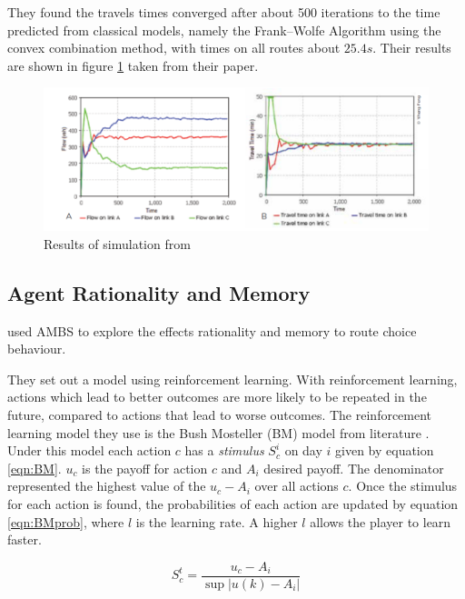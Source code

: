 \documentclass[12pt, a4paper, onecolumn]{article}
\begin{document}
 They found the travels times converged after about 500 iterations to the time predicted from classical models, namely the Frank–Wolfe Algorithm using the convex combination method, with times on all routes about $25.4s$. Their results are shown in figure \ref{fig:primer} taken from their paper.

 \begin{figure}[h!]
	\centering
	\includegraphics[scale=.75]{primer_results.png}
	\caption{Results of simulation from \cite{Zheng2013}}
	\label{fig:primer}
	\end{figure}

\subsection{Agent Rationality and Memory}
\cite{Wei2014} used AMBS to explore the effects rationality and memory to route choice behaviour.

They set out a model using reinforcement learning. With reinforcement learning, actions which lead to better outcomes are more likely to be repeated in the future, compared to actions that lead to worse outcomes. The reinforcement learning model they use is the Bush Mosteller (BM) model from literature \citep{Cross1973}. Under this model each action $c$ has a \textit{stimulus} $S_{c}^{i}$ on day $i$ given by equation \ref{eqn:BM}. $u_{c}$ is the payoff for action $c$ and $A_{i}$ desired payoff. The denominator represented the highest value of the $u_{c} - A_{i}$ over all actions $c$. Once the stimulus for each action is found, the probabilities of each action are updated by equation \ref{eqn:BMprob}, where $l$ is the learning rate. A higher $l$ allows the player to learn faster.

\begin{equation}
	S_{c}^{t} = \frac{u_{c} - A_{i} }{ \sup \left|u(k) - A_{i}\right|}
	\label{eqn:BM}
	\end{equation}
\end{document}
